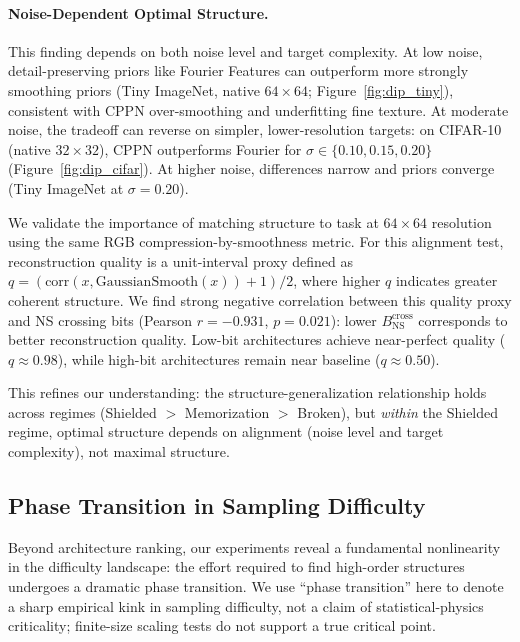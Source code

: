 \documentclass{article}
\begin{document}
\paragraph{Noise-Dependent Optimal Structure.} This finding depends on both noise level and target complexity. At low noise, detail-preserving priors like Fourier Features \cite{tancik2020fourier} can outperform more strongly smoothing priors (Tiny ImageNet, native $64\times 64$; Figure~\ref{fig:dip_tiny}), consistent with CPPN over-smoothing and underfitting fine texture. At moderate noise, the tradeoff can reverse on simpler, lower-resolution targets: on CIFAR-10 (native $32\times 32$), CPPN outperforms Fourier for $\sigma \in \{0.10, 0.15, 0.20\}$ (Figure~\ref{fig:dip_cifar}). At higher noise, differences narrow and priors converge (Tiny ImageNet at $\sigma=0.20$).

We validate the importance of matching structure to task at $64 \times 64$ resolution using the same RGB compression-by-smoothness metric. For this alignment test, reconstruction quality is a unit-interval proxy defined as $q=(\mathrm{corr}(x,\mathrm{GaussianSmooth}(x))+1)/2$, where higher $q$ indicates greater coherent structure. We find strong negative correlation between this quality proxy and NS crossing bits (Pearson $r=-0.931$, $p=0.021$): lower $B_{\text{NS}}^{\text{cross}}$ corresponds to better reconstruction quality. Low-bit architectures achieve near-perfect quality ($q \approx 0.98$), while high-bit architectures remain near baseline ($q \approx 0.50$).

This refines our understanding: the structure-generalization relationship holds across regimes (Shielded $>$ Memorization $>$ Broken), but \emph{within} the Shielded regime, optimal structure depends on alignment (noise level and target complexity), not maximal structure.

\subsection{Phase Transition in Sampling Difficulty}
\label{sec:phase_transition}

Beyond architecture ranking, our experiments reveal a fundamental nonlinearity in the difficulty landscape: the effort required to find high-order structures undergoes a dramatic phase transition. We use ``phase transition'' here to denote a sharp empirical kink in sampling difficulty, not a claim of statistical-physics criticality; finite-size scaling tests do not support a true critical point.
\end{document}
